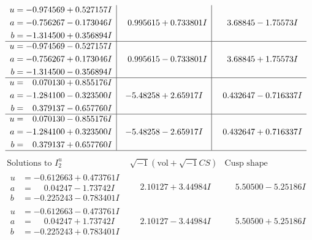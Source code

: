 \documentclass[1p]{elsarticle_modified}
\theoremstyle{definition}
\newcommand{\I}{\sqrt{-1}}
\begin{document}
$$\begin{array}{c|c|c}
\begin{aligned}
u &= -0.974569 + 0.527157 I \\
a &= -0.756267 - 0.173046 I \\
b &= -1.314500 + 0.356894 I\end{aligned}
 & \phantom{-}0.995615 + 0.733801 I & \phantom{-}3.68845 - 1.75573 I \\ \hline\begin{aligned}
u &= -0.974569 - 0.527157 I \\
a &= -0.756267 + 0.173046 I \\
b &= -1.314500 - 0.356894 I\end{aligned}
 & \phantom{-}0.995615 - 0.733801 I & \phantom{-}3.68845 + 1.75573 I \\ \hline\begin{aligned}
u &= \phantom{-}0.070130 + 0.855176 I \\
a &= -1.284100 - 0.323500 I \\
b &= \phantom{-}0.379137 - 0.657760 I\end{aligned}
 & -5.48258 + 2.65917 I & \phantom{-}0.432647 - 0.716337 I \\ \hline\begin{aligned}
u &= \phantom{-}0.070130 - 0.855176 I \\
a &= -1.284100 + 0.323500 I \\
b &= \phantom{-}0.379137 + 0.657760 I\end{aligned}
 & -5.48258 - 2.65917 I & \phantom{-}0.432647 + 0.716337 I\\
 \hline 
 \end{array}$$\newpage$$\begin{array}{c|c|c}  
\text{Solutions to }I^u_{2}& \I (\text{vol} + \sqrt{-1}CS) & \text{Cusp shape}\\
 \hline 
\begin{aligned}
u &= -0.612663 + 0.473761 I \\
a &= \phantom{-}0.04247 - 1.73742 I \\
b &= -0.225243 - 0.783401 I\end{aligned}
 & \phantom{-}2.10127 + 3.44984 I & \phantom{-}5.50500 - 5.25186 I \\ \hline\begin{aligned}
u &= -0.612663 - 0.473761 I \\
a &= \phantom{-}0.04247 + 1.73742 I \\
b &= -0.225243 + 0.783401 I\end{aligned}
 & \phantom{-}2.10127 - 3.44984 I & \phantom{-}5.50500 + 5.25186 I \\ \hline\begin{aligned}

\end{aligned}
\end{array}$$
\end{document}
